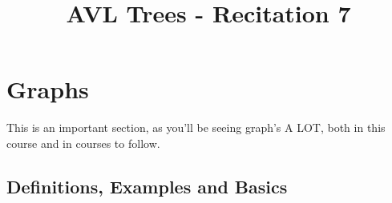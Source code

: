 \title{AVL Trees  - Recitation 7} 

\usetikzlibrary{positioning, arrows}

\iffalse
\newtheorem{prop}{Proposition}
\newtheorem{ex}{Exercise}
\newtheorem{sol}{Solution}
\newtheorem{theorem}{Theorem} \newtheorem{thm}{Theorem}[section]
\newtheorem{conj}[thm]{Conjecture} \newtheorem{lemma}[thm]{Lemma}
\newtheorem{corollary}[thm]{Corollary} \newtheorem{claim}[thm]{Claim}
\newtheorem{proposition}[thm]{Proposition}
\newtheorem{definition}{Definition} \newtheorem{remark}{Remark}
   
\pagestyle{empty}

\setlength{\textwidth}{6.5in}
\setlength{\evensidemargin}{0.0in}
\setlength{\oddsidemargin}{0.0in}
\setlength{\topmargin}{-0.25in}
\setlength{\textheight}{9.0in}
\setlength{\baselineskip}{1.3\baselineskip}
\setlength{\parindent}{.0in}
\fi
{}

\def\LinkedList#1{%
  \foreach \element in \list {
     \node[node of list, right = of aux, name=ele] {\element};
     \draw[link] (aux) -- (ele);
     \coordinate (aux) at (ele.east);
  } 
}





\vspace{0.2in}


\vspace{0.2in}

\section{Graphs}
This is an important section, as you'll be seeing graph's A LOT, both in this course and in courses to follow. 

\subsection{Definitions, Examples and Basics}

